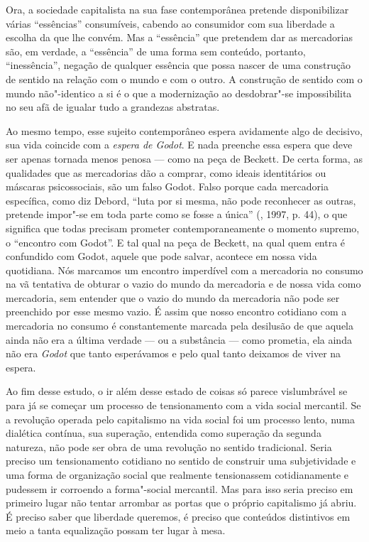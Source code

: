 {Ora, a sociedade capitalista na sua fase contemporânea pretende
disponibilizar várias ``essências'' consumíveis, cabendo ao consumidor
com sua liberdade a escolha da que lhe convém. Mas a ``essência'' que
pretendem dar as mercadorias são, em verdade, a ``essência'' de uma
forma sem conteúdo, portanto, ``inessência'', negação de qualquer
essência que possa nascer de uma construção de sentido na relação com o
mundo e com o outro. A construção de sentido com o mundo não"-identico a
si é o que a modernização ao desdobrar"-se impossibilita no seu afã de
igualar tudo a grandezas abstratas.

Ao mesmo tempo, esse sujeito contemporâneo espera avidamente algo de
decisivo, sua vida coincide com a \emph{espera de Godot}. E nada
preenche essa espera que deve ser apenas tornada menos penosa --- como
na peça de Beckett. De certa forma, as qualidades que as mercadorias dão
a comprar, como ideais identitários ou máscaras psicossociais, são um
falso Godot. Falso porque cada mercadoria específica, como diz Debord,
``luta por si mesma, não pode reconhecer as outras, pretende impor"-se em
toda parte como se fosse a única'' (, 1997, p. 44), o que
significa que todas precisam prometer contemporaneamente o momento
supremo, o ``encontro com Godot''. E tal qual na peça de Beckett, na
qual quem entra é confundido com Godot, aquele que pode salvar, acontece
em nossa vida quotidiana. Nós marcamos um encontro imperdível com a
mercadoria no consumo na vã tentativa de obturar o vazio do mundo da
mercadoria e de nossa vida como mercadoria, sem entender que o vazio do
mundo da mercadoria não pode ser preenchido por esse mesmo vazio. É
assim que nosso encontro cotidiano com a mercadoria no consumo é
constantemente marcada pela desilusão de que aquela ainda não era a
última verdade --- ou a substância --- como prometia, ela ainda não era
\emph{Godot} que tanto esperávamos e pelo qual tanto deixamos de viver
na espera.

Ao fim desse estudo, o ir além desse estado de coisas só parece
vislumbrável se para já se começar um processo de tensionamento com a
vida social mercantil. Se a revolução operada pelo capitalismo na vida
social foi um processo lento, numa dialética contínua, sua superação,
entendida como superação da segunda natureza, não pode ser obra de uma
revolução no sentido tradicional. Seria preciso um tensionamento
cotidiano no sentido de construir uma subjetividade e uma forma de
organização social que realmente tensionassem cotidianamente e pudessem
ir corroendo a forma"-social mercantil. Mas para isso seria preciso em
primeiro lugar não tentar arrombar as portas que o próprio capitalismo
já abriu. É preciso saber que liberdade queremos, é preciso que
conteúdos distintivos em meio a tanta equalização possam ter lugar à
mesa.

}

